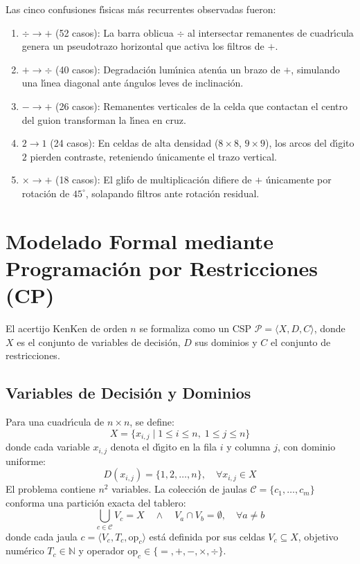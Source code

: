 \documentclass[conference]{IEEEtran}
\begin{document}
Las cinco confusiones f\'{\i}sicas m\'as recurrentes observadas fueron:
\begin{enumerate}
    \item $\div \to +$ (52 casos): La barra oblicua $\div$ al intersectar remanentes de cuadr\'{\i}cula genera un pseudotrazo horizontal que activa los filtros de $+$.
    \item $+ \to \div$ (40 casos): Degradaci\'on lum\'{\i}nica aten\'ua un brazo de $+$, simulando una l\'{\i}nea diagonal ante \'angulos leves de inclinaci\'on.
    \item $- \to +$ (26 casos): Remanentes verticales de la celda que contactan el centro del guion transforman la l\'{\i}nea en cruz.
    \item $2 \to 1$ (24 casos): En celdas de alta densidad ($8\times8$, $9\times9$), los arcos del d\'{\i}gito $2$ pierden contraste, reteniendo \'unicamente el trazo vertical.
    \item $\times \to +$ (18 casos): El glifo de multiplicaci\'on difiere de $+$ \'unicamente por rotaci\'on de $45^\circ$, solapando filtros ante rotaci\'on residual.
\end{enumerate}

\section{Modelado Formal mediante Programaci\'on por Restricciones (CP)}
\label{sec:cp_modeling}

El acertijo KenKen de orden $n$ se formaliza como un CSP $\mathcal{P} = \langle X, D, C \rangle$, donde $X$ es el conjunto de variables de decisi\'on, $D$ sus dominios y $C$ el conjunto de restricciones.

\subsection{Variables de Decisi\'on y Dominios}
Para una cuadr\'{\i}cula de $n \times n$, se define:
\begin{equation}
    X = \{x_{i,j} \mid 1 \le i \le n, \; 1 \le j \le n\}
\end{equation}
donde cada variable $x_{i,j}$ denota el d\'{\i}gito en la fila $i$ y columna $j$, con dominio uniforme:
\begin{equation}
    D(x_{i,j}) = \{1, 2, \dots, n\}, \quad \forall x_{i,j} \in X
\end{equation}
El problema contiene $n^2$ variables. La colecci\'on de jaulas $\mathcal{C} = \{c_1, \dots, c_m\}$ conforma una partici\'on exacta del tablero:
\begin{equation}
    \bigcup_{c \in \mathcal{C}} V_c = X \quad \land \quad V_a \cap V_b = \emptyset, \quad \forall a \ne b
\end{equation}
donde cada jaula $c = \langle V_c, T_c, \text{op}_c \rangle$ est\'a definida por sus celdas $V_c \subseteq X$, objetivo num\'erico $T_c \in \mathbb{N}$ y operador $\text{op}_c \in \{=, +, -, \times, \div\}$.
\end{document}
